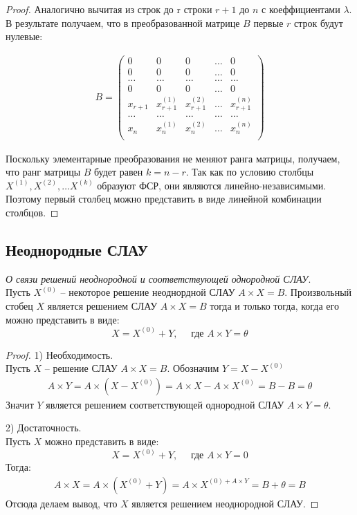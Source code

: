 \begin{proof}
  Аналогично вычитая из строк до r строки $r+1$ до $n$ с коеффициентами  $\lambda$.
  В результате получаем, что в преобразованной матрице $B$ первые  $r$ строк будут нулевые:
  
  \begin{gather*}
    B =
    \begin{pmatrix}
      0 & 0 & 0 & \ldots & 0 \\
      0 & 0 & 0 & \ldots & 0 \\
      \ldots & \ldots & \ldots & \ldots & \ldots \\
      0 & 0 & 0 & \ldots & 0 \\
      x_{r+1} & x_{r+1}^{(1)} & x_{r+1}^{(2)} & \ldots & x_{r+1}^{(n)} \\
      \ldots & \ldots & \ldots & \ldots & \ldots \\
      x_n & x_n^{(1)} & x_n^{(2)} & \ldots & x_n^{(n)} \\
    \end{pmatrix}
  \end{gather*} 

  Поскольку элементарные преобразования не меняют ранга матрицы, получаем, что ранг матрицы $B$ будет равен $k = n - r$.
  Так как по условию столбцы $X^{(1)}, X^{(2)}, \ldots X^{(k)}$ образуют ФСР, они являются линейно-независимыми. Поэтому первый столбец можно представить в виде линейной комбинации столбцов.
\end{proof}

\subsection{Неоднородные СЛАУ}

\begin{theorem}
  \textit{О связи решений неоднородной и соответствующей однородной СЛАУ}. \\
  Пусть $X^{(0)}$ -- некоторое решение неоднордной СЛАУ $A \times X = B$. Произвольный стобец $X$ является решением СЛАУ $A \times X = B$ тогда и только тогда, когда его можно представить в виде:  \[
    X = X^{(0)} + Y, \quad \text{ где } A \times Y = \theta
  \] 
\end{theorem}
\begin{proof}
  1) Необходимость. \\
  Пусть $X$ -- решение СЛАУ $A \times X = B$. Обозначим $Y = X - X^{(0)}$
  \begin{gather*}
    A \times Y = A \times (X - X^{(0)}) = A \times X - A \times X^{(0)} = B - B = \theta
  \end{gather*}
  Значит $Y$ является решением соответствующей однородной СЛАУ  $A \times Y = \theta$.
  
  2) Достаточность. \\
  Пусть $X$ можно представить в виде:  \[
    X = X^{(0)} + Y, \quad \text{ где } A \times Y = 0
  \]
  Тогда:
  \begin{gather*}
  A \times X = A \times (X^{(0)} + Y) = A \times X^{(0) + A \times Y} = B + \theta = B
  \end{gather*}
  Отсюда делаем вывод, что $X$ является решением неоднородной СЛАУ.
\end{proof}

